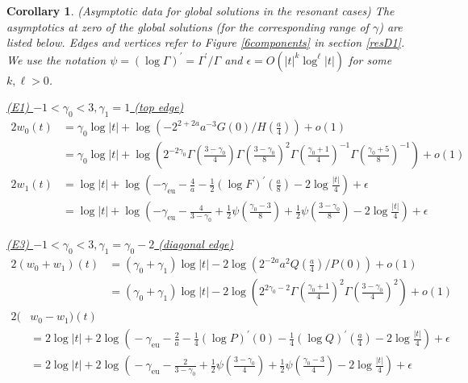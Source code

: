 \documentclass[a4paper,12pt,leqno]{amsart}
\numberwithin{equation}{section}
\theoremstyle{plain}
\newtheorem{corollary}[theorem]{Corollary}
\theoremstyle{definition}
\newcommand{\ga}{\gamma}
\newcommand{\eps}{\epsilon}
\newcommand{\Ga}{\Gamma}
\newcommand{\no}{\noindent}
\newcommand{\pr}{\prime}
\newcommand{\euler}{\gamma_{\scriptscriptstyle\text{eu}}}
\begin{document}
{\begin{corollary}\label{Rasymptoticdata} 
{\em(Asymptotic data for global solutions in the resonant cases)}
The asymptotics at zero of the global solutions (for the corresponding range of $\ga$)
are listed below.  Edges and vertices refer to Figure \ref{6components} in section \ref{resD1}.  We use the notation 
$\psi=(\log\Ga)^\pr = \Ga^\pr/\Ga$ and $\eps=O(\vert t\vert^k \log^\ell \vert t\vert)$ for some $k,\ell>0$.

\no
\underline
{\em
(E1) $-1<\ga_0<3, \ga_1=1$ (top edge)
}
\begin{align*}
2w_0(t)& \!=\! \ga_0 \log\vert t\vert + \log\left(
- 2^{2+2a} a^{-3} G(0)/H(\tfrac a4)
\right)
+o(1)
\\
& \!=\! \ga_0 \log\vert t\vert + \log\left(
2^{-2\ga_0} 
\Ga(  \tfrac{3-\ga_0}4 )
\Ga(  \tfrac{3-\ga_0}8 )^2
\Ga(  \tfrac{\ga_0+1}4 )^{-1}
\Ga(  \tfrac{\ga_0+5}8 )^{-1}
\right)
+o(1)
\\
2w_1(t)& \!=\! \log\vert t\vert + \log \left(
 - \euler \!-\! \tfrac4a \!-\! \tfrac12 (\log F)^\pr(\tfrac a8)
 \!-\! 2\log\tfrac{\vert t\vert}{4}
\right)
+\eps
\\
& \!=\! \log\vert t\vert + \log \left(
-\euler \!-\! \tfrac 4{3-\ga_0} \!+\!
\tfrac12 \psi( \tfrac{\ga_0-3}8) \!+\!
\tfrac12 \psi( \tfrac{3-\ga_0}8) \!-\! 
2\log\tfrac{\vert t\vert}{4}
\right)
+\eps
\end{align*}

\no 
\underline
{\em
(E3)  $-1<\ga_0<3, \ga_1=\ga_0-2$ (diagonal edge)
}
\begin{align*}
2(w_0+w_1)(t)& \!=\! (\ga_0 \!+\! \ga_1)\log\vert t\vert 
- 2\log\left( 2^{-2a} a^2 Q(\tfrac a4) / P(0) 
\right)
+ o(1)
\\
&=  (\ga_0 \!+\!\ga_1)\log\vert t\vert 
- 2\log\left(
2^{2\ga_0-2}
\Ga(  \tfrac{\ga_0+1}4 )^{2}
\Ga(  \tfrac{3-\ga_0}4 )^{2}
\right)
+ o(1)
\end{align*}
\begin{align*}
2( & w_0  - w_1)(t) 
\\
&\!=\!  2 \log\vert t\vert 
\!+\! 2\log \left(   
\! - \euler \!-\! \tfrac2a \!-\! \tfrac14 (\log P)^\pr(0) 
\!-\! \tfrac14 (\log Q)^\pr(\tfrac a4) \!-\! 2\log\tfrac{\vert t\vert}{4}
  \right)
+ \eps
\\
& \!=\!  2 \log\vert t\vert 
\!+\! 2\log \left(   
\! - \euler \!-\! \tfrac2{3-\ga_0} 
\!+\!
\tfrac12 \psi( \tfrac{3-\ga_0}4) 
\!+\!
\tfrac12 \psi( \tfrac{\ga_0-3}4)
\!-\! 2\log\tfrac{\vert t\vert}{4}
\right)
+ \eps
\end{align*}


\end{corollary}}
\end{document}
